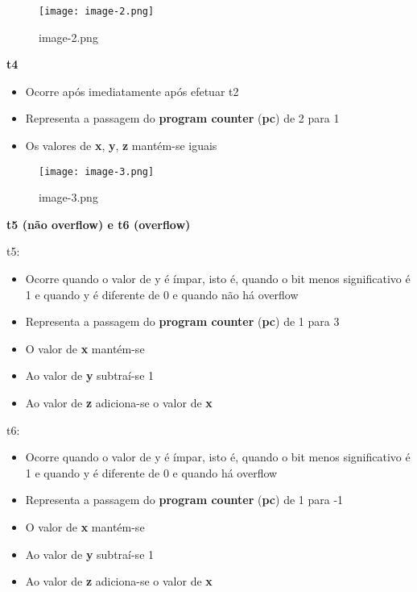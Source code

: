 \documentclass[11pt]{article}
\providecommand{\tightlist}{%
      \setlength{\itemsep}{0pt}\setlength{\parskip}{0pt}}
\begin{document}
\begin{figure}
\centering
\texttt{[image: image-2.png]}
\caption{image-2.png}
\end{figure}

\hypertarget{t4}{%
\textbf{\Large t4}\label{t4}}

\begin{itemize}
\tightlist
\item
  Ocorre após imediatamente após efetuar t2
\item
  Representa a passagem do \textbf{program counter} (\textbf{pc}) de 2
  para 1
\item
  Os valores de \textbf{x}, \textbf{y}, \textbf{z} mantém-se iguais
\end{itemize}

\begin{figure}
\centering
\texttt{[image: image-3.png]}
\caption{image-3.png}
\end{figure}
\pagebreak
\hypertarget{t5-nuxe3o-overflow-e-t6-overflow}{%
\textbf{\Large t5 (não overflow) e t6
(overflow)}\label{t5-nuxe3o-overflow-e-t6-overflow}}

t5:

\begin{itemize}
\tightlist
\item
  Ocorre quando o valor de y é ímpar, isto é, quando o bit menos
  significativo é 1 e quando y é diferente de 0 e quando não há overflow
\item
  Representa a passagem do \textbf{program counter} (\textbf{pc}) de 1
  para 3
\item
  O valor de \textbf{x} mantém-se
\item
  Ao valor de \textbf{y} subtraí-se 1
\item
  Ao valor de \textbf{z} adiciona-se o valor de \textbf{x}
\end{itemize}

t6:

\begin{itemize}
\tightlist
\item
  Ocorre quando o valor de y é ímpar, isto é, quando o bit menos
  significativo é 1 e quando y é diferente de 0 e quando há overflow
\item
  Representa a passagem do \textbf{program counter} (\textbf{pc}) de 1
  para -1
\item
  O valor de \textbf{x} mantém-se
\item
  Ao valor de \textbf{y} subtraí-se 1
\item
  Ao valor de \textbf{z} adiciona-se o valor de \textbf{x}
\end{itemize}
\end{document}
